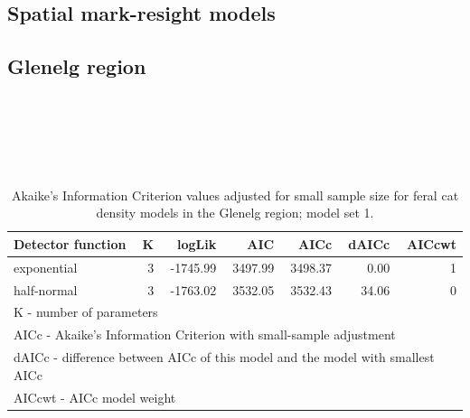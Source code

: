 \documentclass[11pt,a4paper,titlepage,twoside,openright]{style/unimelbthesis}
\begin{document}
\begin{mainmatter}
\hypertarget{spatial-mark-resight-models}{%
\section{Spatial mark-resight models}\label{spatial-mark-resight-models}}

\hypertarget{glenelg-region-5}{%
\subsection{Glenelg region}\label{glenelg-region-5}}

\(~\)

\(~\)

\(~\)

\begingroup\fontsize{10}{12}\selectfont
\begin{longtable}[t]{lrrrrrr}
\caption{\label{tab:density-aic-g-1}Akaike's Information Criterion values adjusted for small sample size for feral cat density models in the Glenelg region; model set 1.}\\
\toprule
Detector function & K & logLik & AIC & AICc & dAICc & AICcwt\\
\midrule
exponential & 3 & -1745.99 & 3497.99 & 3498.37 & 0.00 & 1\\
half-normal & 3 & -1763.02 & 3532.05 & 3532.43 & 34.06 & 0\\
\bottomrule
\multicolumn{7}{l}{\rule{0pt}{1em}K - number of parameters}\\
\multicolumn{7}{l}{\rule{0pt}{1em}AICc - Akaike's Information Criterion with small-sample adjustment}\\
\multicolumn{7}{l}{\rule{0pt}{1em}dAICc - difference between AICc of this model and the model with smallest AICc}\\
\multicolumn{7}{l}{\rule{0pt}{1em}AICcwt - AICc model weight}\\
\end{longtable}
\endgroup{}

\newpage

\(~\)

\(~\)

\(~\)


\end{mainmatter}
\end{document}
